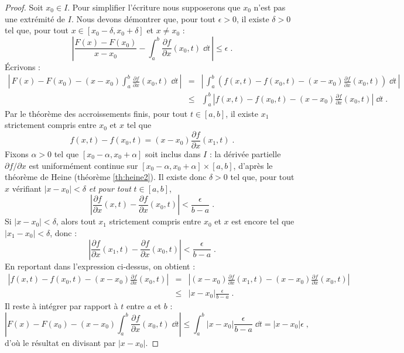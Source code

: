 \documentclass[class=report,crop=false]{standalone}
\begin{document}
\begin{proof}
Soit $x_0\in I$. Pour simplifier l'écriture nous supposerons que $x_0$ n'est pas une extrémité de $I$.
Nous devons démontrer que, pour tout $\epsilon>0$, il
existe $\delta>0$ tel que, pour tout $x\in [x_0-\delta,x_0+\delta]$ et $x\neq x_0$ :
$$\left|\frac{F(x)-F(x_0)}{x-x_0} - \int_a^b \frac{\partial f}{\partial x}(x_0,t)\;\dd t\,\right| \le \epsilon\;.
$$
\'Ecrivons :
\begin{eqnarray*}
\displaystyle{\left|\,F(x)-F(x_0)-(x-x_0)\int_a^b 
\frac{\partial f}{\partial x}(x_0,t)\;\dd t\,\right|}
&=& \displaystyle{\left|\,\int_a^b \left(f(x,t)-f(x_0,t)-
(x-x_0)\frac{\partial f}{\partial x}(x_0,t)\right)\;\dd t\,\right|}\\[1.5ex]
&\le& \displaystyle{\int_a^b \left|
f(x,t)-f(x_0,t) - (x-x_0)\frac{\partial f}{\partial
  x}(x_0,t)\right|\;\dd t\;.}
\end{eqnarray*}
Par le théorème des accroissements finis, pour tout $t\in[a,b]$, il existe 
$x_1$ strictement compris entre $x_0$ et $x$ tel que 
$$
f(x,t)-f(x_0,t) = (x-x_0)\frac{\partial f}{\partial x}(x_1,t)\;.
$$
Fixons $\alpha>0$ tel que
$[x_0-\alpha,x_0+\alpha]$ soit inclus dans $I$ : la dérivée
partielle $\partial f/\partial x$ est uniformément continue sur
$[x_0-\alpha, x_0+\alpha]\times [a,b]$, d'après le théorème de
Heine (théorème \ref{th:heine2}). Il existe donc $\delta>0$ tel que, pour tout $x$ 
vérifiant $|x-x_0|<\delta$ \emph{et pour tout} $t\in [a,b]$, 
$$
\left|\frac{\partial f}{\partial x}(x,t)-
\frac{\partial f}{\partial x}(x_0,t)\right|< \frac{\epsilon}{b-a}\;.
$$
Si $|x-x_0|<\delta$, alors tout $x_1$ strictement compris entre $x_0$ et
$x$ est encore tel que $|x_1-x_0|<\delta$, donc :
$$
\left|\frac{\partial f}{\partial x}(x_1,t)-
\frac{\partial f}{\partial x}(x_0,t)\right|< \frac{\epsilon}{b-a}\;.
$$
En reportant dans l'expression ci-dessus, on obtient :
\begin{eqnarray*}
\displaystyle{
\left|f(x,t)-f(x_0,t)- (x-x_0)\frac{\partial f}{\partial
    x}(x_0,t)\right|}
&=&
\displaystyle{
\left|(x-x_0)\frac{\partial f}{\partial
    x}(x_1,t)- (x-x_0)\frac{\partial f}{\partial
    x}(x_0,t)\right|}\\[1.5ex]
&\le&
|x-x_0|\frac{\epsilon}{b-a}\;.
\end{eqnarray*}
Il reste à intégrer par rapport à $t$ entre $a$ et $b$ :
$$
\left|F(x)-F(x_0)-(x-x_0)\int_a^b 
\frac{\partial f}{\partial x}(x_0,t)\;\dd t\right|
\le \int_a^b |x-x_0|\frac{\epsilon}{b-a}\;\dd t
=|x-x_0|\epsilon\;,
$$
d'où le résultat en divisant par $|x-x_0|$.
\end{proof}
\end{document}
